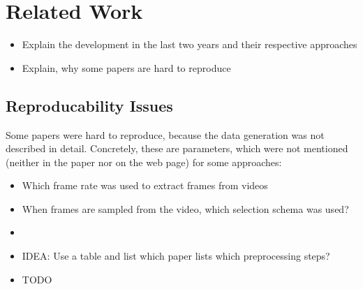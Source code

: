 \section{Related Work}
\label{sec:related}

\begin{itemize}
	\item Explain the development in the last two years and their respective approaches
	\item Explain, why some papers are hard to reproduce
\end{itemize}

\subsection{Reproducability Issues}
Some papers were hard to reproduce, because the data generation was not described in detail.
Concretely, these are parameters, which were not mentioned (neither in the paper nor on the web page) for some approaches:
\begin{itemize}
	\item Which frame rate was used to extract frames from videos
	\item When frames are sampled from the video, which selection schema was used?
	\item 
	\item IDEA: Use a table and list which paper lists which preprocessing steps?
	\item TODO
\end{itemize}

